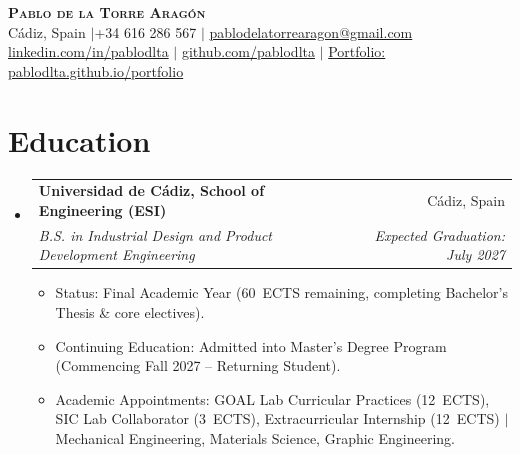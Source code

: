 \documentclass[a4paper,10pt]{article}
\makeatletter
\newcommand{\resumeItem}[1]{
  \item\small{#1\vspace{-1.5pt}}
}
\newcommand{\resumeSubheading}[4]{
  \vspace{0.5pt}\item
    \begin{tabular*}{0.99\textwidth}[t]{@{}l@{\extracolsep{\fill}}r@{}}
      \textbf{#1} & #2 \\
      \textit{\small#3} & \textit{\small #4} \\
    \end{tabular*}\vspace{-2.5pt}
}
\newcommand{\resumeSubHeadingListStart}{\begin{itemize}[leftmargin=0.0in, label={}, itemsep=0.5pt]}
\newcommand{\resumeSubHeadingListEnd}{\end{itemize}\vspace{-3pt}}
\newcommand{\resumeItemListStart}{\begin{itemize}[leftmargin=0.15in, label=\textbullet, itemsep=0pt, parsep=0pt]}
\newcommand{\resumeItemListEnd}{\end{itemize}\vspace{-2pt}}
\makeatother
\begin{document}
\begin{center}
  {\Huge\bfseries\scshape Pablo de la Torre Aragón}\\[2pt]
  {\small Cádiz, Spain \enspace$|$\enspace +34 616 286 567 \enspace$|$\enspace
  \href{mailto:pablodelatorrearagon@gmail.com}{pablodelatorrearagon@gmail.com}}\\[1.5pt]
  {\small \href{https://linkedin.com/in/pablodlta}{linkedin.com/in/pablodlta} \enspace$|$\enspace
  \href{https://github.com/pablodlta}{github.com/pablodlta} \enspace$|$\enspace
  \href{https://pablodlta.github.io/portfolio}{Portfolio: pablodlta.github.io/portfolio}}
\end{center}
\vspace{-6pt}

\section{Education}
  \resumeSubHeadingListStart
    \resumeSubheading
      {Universidad de Cádiz, School of Engineering (ESI)}{Cádiz, Spain}
      {B.S. in Industrial Design and Product Development Engineering}{Expected Graduation: July 2027}
      \resumeItemListStart
        \resumeItem{Status: Final Academic Year (60~ECTS remaining, completing Bachelor's Thesis \& core electives).}
        \resumeItem{Continuing Education: Admitted into Master's Degree Program (Commencing Fall 2027 -- Returning Student).}
        \resumeItem{Academic Appointments: GOAL Lab Curricular Practices (12~ECTS), SIC Lab Collaborator (3~ECTS), Extracurricular Internship (12~ECTS) $|$ Mechanical Engineering, Materials Science, Graphic Engineering.}
      \resumeItemListEnd
  \resumeSubHeadingListEnd

\end{document}

